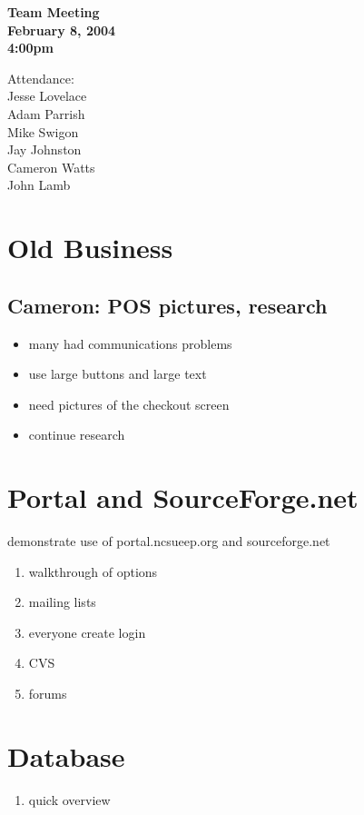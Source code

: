 \documentclass{article}
\begin{document}
\begin{flushleft}
{\bf Team Meeting}\\
{\bf February 8, 2004}\\
{\bf 4:00pm}\\
\end{flushleft}

\begin{flushleft}
Attendance:\\
Jesse Lovelace \\
Adam Parrish \\
Mike Swigon \\
Jay Johnston \\
Cameron Watts \\
John Lamb \\
\end{flushleft}

\section{Old Business}
    \subsection{Cameron: POS pictures, research}
    \begin{itemize}
        \item many had communications problems
        \item use large buttons and large text
        \item need pictures of the checkout screen
        \item continue research
    \end{itemize}

\section{Portal and SourceForge.net}
demonstrate use of portal.ncsueep.org and sourceforge.net
\begin{enumerate}
    \item walkthrough of options
    \item mailing lists
    \item everyone create login
    \item CVS
    \item forums
\end{enumerate}

\section{Database}
\begin{enumerate}
    \item quick overview
\end{enumerate}
\end{document}
